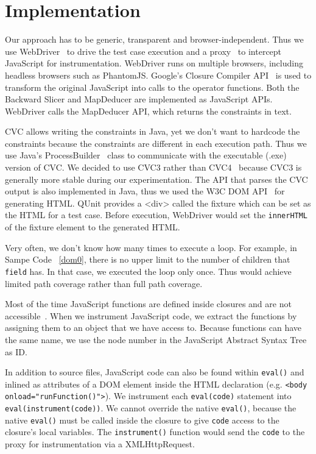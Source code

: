 \section{Implementation}

Our approach has to be generic, transparent and browser-independent.  Thus we use WebDriver~\cite{webdriver} to drive the test case execution and a proxy~\cite{webscarab} to intercept JavaScript for instrumentation.  WebDriver runs on multiple browsers, including headless browsers such as PhantomJS.  
Google's Closure Compiler API~\cite{ClosureCompiler} is used to transform the original JavaScript into calls to the operator functions. 
Both the Backward Slicer and MapDeducer are implemented as JavaScript APIs.  WebDriver calls the MapDeducer API, which returns the constraints in text.  

CVC allows writing the constraints in Java, yet we don't want to hardcode the constraints because the constraints are different in each execution path.  
Thus we use Java's ProcessBuilder~\cite{processbuilder} class to communicate with the executable (.exe) version of CVC.  We decided to use CVC3 rather than CVC4~\cite{cvc4} because CVC3 is generally more stable during our experimentation.  
The API that parses the CVC output is also implemented in Java, thus we used the W3C DOM API~\cite{DomAPI} for generating HTML.  
QUnit provides a <div> called the fixture which can be set as the HTML for a test case.   Before execution, WebDriver would set the {\tt innerHTML} of the fixture element to the generated HTML.  

Very often, we don't know how many times to execute a loop.  For example, in Sampe Code ~\ref{dom0}, there is no upper limit to the number of children that {\tt field} has.  
In that case, we executed the loop only once.  Thus \tool would achieve limited path coverage rather than full path coverage.  

Most of the time JavaScript functions are defined inside closures and are not accessible~\cite{privatefunctions}.  
When we instrument JavaScript code, we extract the functions by assigning them to an object that we have access to.  Because functions can have the same name, we use the node number in the JavaScript Abstract Syntax Tree as ID.

In addition to source files, JavaScript code can also be found within {\tt eval()} and inlined as attributes of a DOM element inside the HTML declaration (e.g. {\tt <body onload="runFunction()">}).
We instrument each {\tt eval(code)} statement into {\tt eval(instrument(code))}.  We cannot override the native {\tt eval()}, because the native {\tt eval()} must be called inside the closure to give {\tt code} access to the closure's local variables.  
The {\tt instrument()} function would send the {\tt code} to the proxy for instrumentation via a XMLHttpRequest.  

